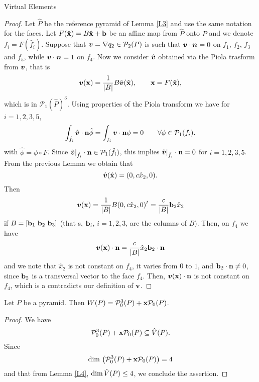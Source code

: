 \begin{chapter}{Virtual Elements}
\begin{proof}
Let $\hat P$ be the reference pyramid of Lemma \ref{L3} and
use the same notation for the faces. Let $F(\hat {\bf x})=B\hat
{\bf x} + {\bf b}$ be an affine map from $\hat P$ onto $P$ and we denote
$f_i=F(\hat f_i)$. Suppose
that $\boldsymbol{v}=\nabla q_2\in \mathcal P_2(P)$ is such that
$\boldsymbol{v}\cdot\boldsymbol{n}=0$ on $f_1$, $f_2$, $f_3$ and $f_5$, while
$\boldsymbol{v}\cdot\boldsymbol{n}=1$ on $f_4$. Now we consider $\hat{\boldsymbol{v}}$
obtained via the Piola trasform from $\boldsymbol{v}$, that is
\begin{equation}\label{piola}
\boldsymbol{v}({\bf x}) = \frac1{|B|}B\hat{\boldsymbol{v}}(\hat{\bf x}), \qquad {\bf x}=F(\hat {\bf x}),
\end{equation}
which is in $\mathcal P_1(\hat P)^3$. Using properties of the Piola transform \cite[pages 12--14]{BBDDFF} we have for $i=1,2,3,5$,
\[
\int_{\hat f_i}\hat {\boldsymbol{v}}\cdot {\bf n}\hat\phi = \int_{f_i}\boldsymbol{v}\cdot {\bf n}\phi =0\qquad \forall \phi\in\mathcal P_1(f_i).
\]
with $\hat \phi = \phi\circ F$. Since $\hat{\boldsymbol{v}}|_{\hat f_i}\cdot {\bf n}\in\mathcal P_1(\hat f_i)$, this implies $\hat{\boldsymbol{v}}|_{\hat f_i}\cdot {\bf n}=0$ for $i=1,2,3,5$. From the previous Lemma we obtain that
\[
\hat{\boldsymbol{v}}(\hat{\bf x})=(0,c\hat x_2,0).
\]
Then
\[
\boldsymbol{v}({\bf x})=\frac1{|B|}B(0,c\hat x_2,0)^t = \frac c{|B|}{\bf b}_2 \hat x_2
\]
if $B=[{\bf b}_1\,\,{\bf b}_2\,\,{\bf b}_3]$ (that s, ${\bf b}_i$, $i=1,2,3$,  are the columns of $B$). Then, on $f_4$ we have 
\[
\boldsymbol{v}({\bf x})\cdot {\bf n}=\frac c{|B|}\hat x_2{\bf b}_2\cdot {\bf n} 
\]
and we note that $\hat x_2$ is not constant on $f_4$, it varies from $0$ to $1$, and ${\bf b}_2\cdot {\bf n}\ne 0$, since ${\bf b}_2$ is a transversal vector to the face $f_4$. Then, $\boldsymbol{v}({\bf x})\cdot {\bf n}$ is not constant on $f_4$, which is a contradicts our definition of $\bf v$.  
\end{proof}

\begin{proposition}
Let $P$ be a pyramid. Then $W(P)=\mathcal
P_0^3(P)+{\bf x}\mathcal P_0(P)$.
\end{proposition}
\begin{proof}
We have
\[
\mathcal P_0^3(P)+{\bf x}\mathcal P_0(P)\subseteq \hat
V(P).
\]
Since
\[
\mbox{dim\,}\left(\mathcal P_0^3(P)+{\bf x}\mathcal
P_0(P)\right)=4
\]
and that from Lemma \ref{L4}, $\mbox{dim\,}\hat
V(P)\le4$, we conclude the assertion.
\end{proof}


\end{chapter}
